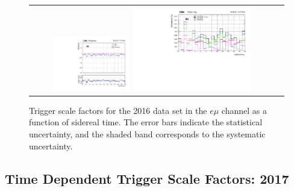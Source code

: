 \begin{figure}[h]
  \begin{center}
    \begin{tabular}{cc}
      \includegraphics[width=0.32\textwidth]{fig_2016_sidereal/g_emu_sidereel_FullSystUncBand.pdf}
      \includegraphics[width=0.50\textwidth]{fig_2016_sidereal/g_emu_sidereel_ErrorsBreakdown.pdf}\\
    \end{tabular}
    \caption{Trigger scale factors for the 2016 data set in the $e\mu$ channel as a function of sidereal time.
            The error bars indicate the statistical uncertainty, and the shaded band corresponds to the systematic uncertainty.
            }
    \label{TrigSF_SideReal_2016_1}
  \end{center}
\end{figure}

\newpage
\subsection{Time Dependent Trigger Scale Factors: 2017}
\label{TrigSFResults_SideReal_2017}

